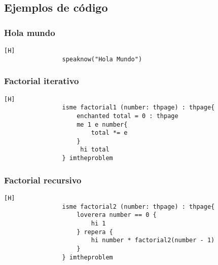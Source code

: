 \documentclass{article}
\begin{document}
            \subsection{Ejemplos de código}
                \subsubsection{Hola mundo}
                \begin{lstlisting}[caption={}][H]
                speaknow("Hola Mundo")
                \end{lstlisting}
                \subsubsection{Factorial iterativo}
                \begin{lstlisting}[caption={}][H]
                isme factorial1 (number: thpage) : thpage{
                    enchanted total = 0 : thpage
                    me 1 e number{
                        total *= e
                    }
                     hi total
                } imtheproblem
                \end{lstlisting}
                \subsubsection{Factorial recursivo}
                
                \begin{lstlisting}[caption={}][H]
                isme factorial2 (number: thpage) : thpage{
                    loverera number == 0 {
                        hi 1
                    } repera {
                        hi number * factorial2(number - 1)
                    }
                } imtheproblem
                \end{lstlisting}

	
		
	
\end{document}
